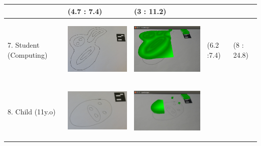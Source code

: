 \documentclass[11pt]{article}
\begin{document}
\begin{landscape}
\begin{longtable}{p{}| p{}| p{} | p{} |p{}}
							& (4.7 : 7.4)
							& (3 : 11.2)\\
\hline
7. Student (Computing) & \begin{center}\includegraphics[scale=0.5]{pics/usertesting/7.png}\end{center} 
							& \begin{center}\includegraphics[scale=0.5]{pics/usertesting/7render.png}\end{center} 
							& (6.2 :7.4)
							& (8 : 24.8)\\
\hline	
8. Child (11y.o) & \begin{center}\includegraphics[scale=0.5]{pics/usertesting/8.png}\end{center} 
							& \begin{center}\includegraphics[scale=0.5]{pics/usertesting/8render.png}\end{center} 

\end{longtable}
\end{landscape}
\end{document}
